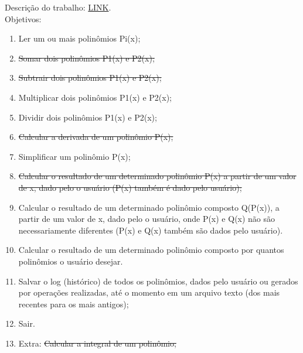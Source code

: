 \documentclass[a4paper]{article}
\begin{document}
Descrição do trabalho:
\href{https://sites.google.com/site/christianersbrasil/classroom-news/descricaodotrabalho-gbc024cacb}
{LINK}.\\

Objetivos:
\begin{enumerate}
\item Ler um ou mais polinômios Pi(x);
\item \sout{Somar dois polinômios P1(x) e P2(x);}
\item \sout{Subtrair dois polinômios P1(x) e P2(x);}
\item Multiplicar dois polinômios P1(x) e P2(x); 
\item Dividir dois polinômios P1(x) e P2(x);
\item \sout{Calcular a derivada de um polinômio P(x);}
\item Simplificar um polinômio P(x);
\item \sout{Calcular o resultado de um determinado polinômio P(x) a partir de um valor de x,
 dado pelo o usuário (P(x) também é dado pelo usuário);}
\item Calcular o resultado de um determinado polinômio composto Q(P(x)), a partir de 
um valor de x, dado pelo o usuário, onde P(x) e Q(x) não são necessariamente 
diferentes (P(x) e Q(x) também são dados pelo usuário).
\item Calcular o resultado de um determinado polinômio composto por quantos 
polinômios o usuário desejar.
\item Salvar o log (histórico) de todos os polinômios, dados pelo usuário ou gerados 
por operações realizadas, até o momento em um arquivo texto (dos mais 
recentes para os mais antigos);
\item Sair.
\item Extra: \sout{Calcular a integral de um polinômio;}
\end{enumerate}
\end{document}
